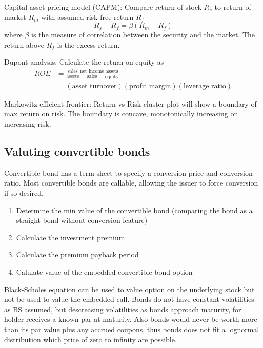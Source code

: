 \documentclass[9pt,twocolumn]{extarticle}
\begin{document}
Capital asset pricing model (CAPM): Compare return of stock $R_s$ to return of
market $R_m$ with assumed risk-free return $R_f$ \[
    R_s - R_f = \beta (R_m - R_f)
\]
where $\beta$ is the measure of correlation between the security and the market.
The return above $R_f$ is the excess return.

Dupont analysis: Calculate the return on equity as
\begin{align*}
ROE &= \frac{\textrm{sales}}{\textrm{assets}}\frac{\textrm{net
    income}}{\textrm{sales}}\frac{\textrm{assets}}{\textrm{equity}} \\
&= (\textrm{asset turnover})(\textrm{profit margin})(\textrm{leverage ratio})
\end{align*}

Markowitz efficient frontier: Return vs Risk cluster plot will show a boundary
of max return on risk. The boundary is concave, monotonically increasing on
increasing risk.

\subsection*{Valuting convertible bonds}
Convertible bond has a term sheet to specify a conversion price and conversion
ratio. Most convertible bonds are callable, allowing the issuer to force
conversion if so desired.

\begin{enumerate}
\item Determine the min value of the convertible bond (comparing the bond as a
    straight bond without conversion feature)
\item Calculate the investment premium
\item Calculate the premium payback period
\item Calulate value of the embedded convertible bond option
\end{enumerate}
Black-Scholes equation can be used to value option on the underlying stock but
not be used to value the embedded call. Bonds do not have constant volatilities
as BS assumed, but descreasing volatilities as bonds approach maturity, for
holder receives a known par at maturity. Also bonds would never be worth more
than its par value plus any accrued coupons, thus bonds does not fit a lognormal
distribution which price of zero to infinity are possible.
\end{document}
